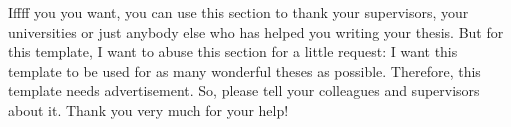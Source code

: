 \documentclass[../main.tex]{subfiles}
\begin{document}
\thispagestyle{empty}

\vspace*{2cm}

\begin{center}
 { \myAcknowTitle}
\end{center}

\vspace{1cm}
\noindent
Iffff you you want, you can use this section to thank your supervisors, your universities or just anybody else who has helped you writing your thesis.
But for this template, I want to abuse this section for a little request:
I want this template to be used for as many wonderful theses as possible.
Therefore, this template needs advertisement.
So, please tell your colleagues and supervisors about it.
Thank you very much for your help!
\end{document}
